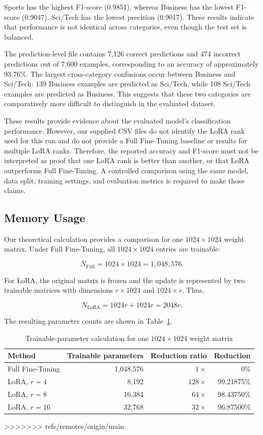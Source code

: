 Sports has the highest F1-score (0.9851), whereas Business has
the lowest F1-score (0.9047). Sci/Tech has the lowest precision
(0.9017). These results indicate that performance is not identical
across categories, even though the test set is balanced.

The prediction-level file contains 7,126 correct predictions and
474 incorrect predictions out of 7,600 examples, corresponding
to an accuracy of approximately 93.76\%. The largest
cross-category confusions occur between Business and Sci/Tech:
139 Business examples are predicted as Sci/Tech, while 108
Sci/Tech examples are predicted as Business. This suggests that
these two categories are comparatively more difficult to
distinguish in the evaluated dataset.

These results provide evidence about the evaluated model's
classification performance. However, our supplied CSV
files do not identify the LoRA rank used for this run and do not
provide a Full Fine-Tuning baseline or results for multiple
LoRA ranks. Therefore, the reported accuracy and F1-score must
not be interpreted as proof that one LoRA rank is better than
another, or that LoRA outperforms Full Fine-Tuning. A controlled
comparison using the same model, data split, training settings,
and evaluation metrics is required to make those claims.

\subsection{Memory Usage}

Our theoretical calculation provides a comparison for one
$1024 \times 1024$ weight matrix. Under Full Fine-Tuning, all
$1024 \times 1024$ entries are trainable:

$$
	N_{\mathrm{Full}} = 1024 \times 1024 = 1,048,576.
$$

For LoRA, the original matrix is frozen and the update is
represented by two trainable matrices with dimensions
$r \times 1024$ and $1024 \times r$. Thus,

$$
	N_{\mathrm{LoRA}} = 1024r + 1024r = 2048r.
$$

The resulting parameter counts are shown in
Table~\ref{tab:parameters}.

\begin{table}[htbp]
	\centering
	\caption{Trainable-parameter calculation for one
		$1024 \times 1024$ weight matrix}
	\label{tab:parameters}
	\begin{tabular}{lrrr}
		\hline
		Method           & Trainable parameters & Reduction ratio & Reduction  \\
		\hline
		Full Fine-Tuning & 1,048,576            & $1\times$       & 0\%        \\
		LoRA, $r=4$      & 8,192                & $128\times$     & 99.21875\% \\
		LoRA, $r=8$      & 16,384               & $64\times$      & 98.43750\% \\
		LoRA, $r=16$     & 32,768               & $32\times$      & 96.87500\% \\
		\hline
	\end{tabular}
	>>>>>>> refs/remotes/origin/main
\end{table}

